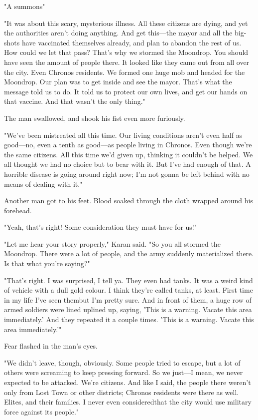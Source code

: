 "A summons\el "

"It was about this scary, mysterious illness. All these citizens are
dying, and yet the authorities aren't doing anything. And get this---the
mayor and all the big-shots have vaccinated themselves already, and plan
to abandon the rest of us. How could we let that pass? That's why we
stormed the Moondrop. You should have seen the amount of people there.
It looked like they came out from all over the city. Even Chronos
residents. We formed one huge mob and headed for the Moondrop. Our plan
was to get inside and see the mayor. That's what the message told us to
do. It told us to protect our own lives, and get our hands on that
vaccine. And that wasn't the only thing."

The man swallowed, and shook his fist even more furiously.

"We've been mistreated all this time. Our living conditions aren't even
half as good---no, even a tenth as good---as people living in Chronos. Even
though we're the same citizens. All this time we'd given up, thinking it
couldn't be helped. We all thought we had no choice but to bear with it.
But I've had enough of that. A horrible disease is going around right
now; I'm not gonna be left behind with no means of dealing with it."

Another man got to his feet. Blood soaked through the cloth wrapped
around his forehead.

"Yeah, that's right! Some consideration they must have for us!"

"Let me hear your story properly," Karan said. "So you all stormed the
Moondrop. There were a lot of people, and the army suddenly materialized
there. Is that what you're saying?"

"That's right. I was surprised, I tell ya. They even had tanks. It was a
weird kind of vehicle with a dull gold colour. I think they're called
tanks, at least. First time in my life I've seen them\el but I'm pretty
sure. And in front of them, a huge row of armed soldiers were lined
up\el lined up, saying, 'This is a warning. Vacate this area
immediately.' And they repeated it a couple times. 'This is a warning.
Vacate this area immediately.'"

Fear flashed in the man's eyes.

"We didn't leave, though, obviously. Some people tried to escape, but a
lot of others were screaming to keep pressing forward. So we just---I
mean, we never expected to be attacked. We're citizens. And like I said,
the people there weren't only from Lost Town or other districts; Chronos
residents were there as well. Elites, and their families. I never even
considered\el that the city would use military force against its
people."

